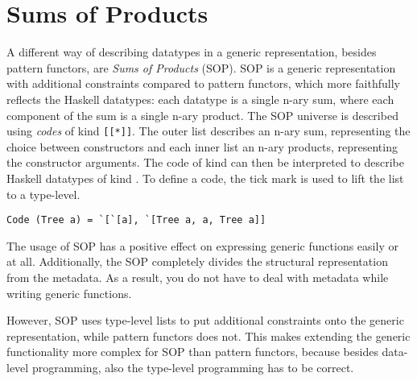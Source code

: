 \section{Sums of Products}
A different way of describing datatypes in a generic representation, besides pattern functors, are \textit{Sums of Products}\cite{vries2014sums} (SOP). SOP is a generic representation with additional constraints compared to pattern functors, which more faithfully reflects the Haskell datatypes: each datatype is a single n-ary sum, where each component of the sum is a single n-ary product. The SOP universe is described using \textit{codes} of kind \texttt{[[*]]}. The outer list describes an n-ary sum, representing the choice between constructors and each inner list an n-ary products, representing the constructor arguments.  The code of kind \inlinehaskell{[[*]]} can then be interpreted to describe Haskell datatypes of kind \inlinehaskell{*}. To define a code, the tick mark  is used to lift the list to a type-level. 

\begin{verbatim}
Code (Tree a) = `[`[a], `[Tree a, a, Tree a]]
\end{verbatim}

The usage of SOP has a positive effect on expressing generic functions easily or at all. Additionally, the SOP completely divides the structural representation from the metadata. As a result, you do not have to deal with metadata while writing generic functions. 

However, SOP uses type-level lists to put additional constraints onto the generic representation, while pattern functors does not. This makes extending the generic functionality more complex for SOP than pattern functors, because besides data-level programming, also the type-level programming has to be correct.